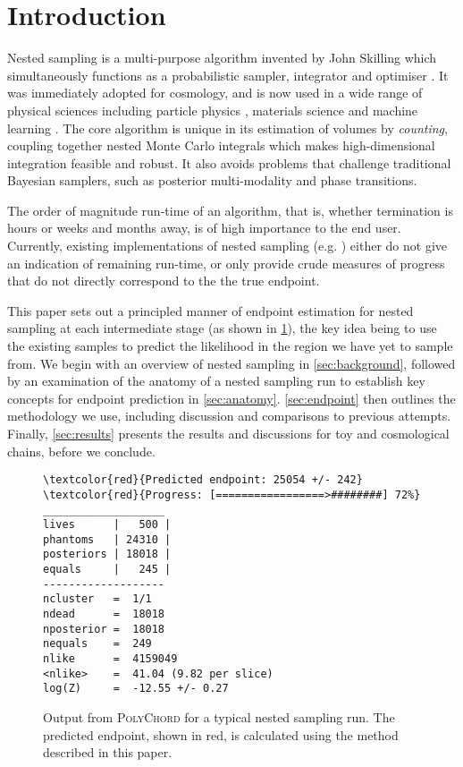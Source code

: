 \documentclass[usenatbib]{mnras}
\begin{document}
\section{Introduction}
Nested sampling is a multi-purpose algorithm invented by John Skilling which simultaneously functions as a probabilistic sampler, integrator and optimiser \citep{skilling}. It was immediately adopted for cosmology, and is now used in a wide range of physical sciences including particle physics \citep{Trotta_2008}, materials science \citep{materials} and machine learning \citep{sparse_reconstruction}. The core algorithm is unique in its estimation of volumes by \textit{counting}, coupling together nested Monte Carlo integrals which makes high-dimensional integration feasible and robust. It also avoids problems that challenge traditional Bayesian samplers, such as posterior multi-modality and phase transitions.
\par
The order of magnitude run-time of an algorithm, that is, whether termination is hours or weeks and months away, is of high importance to the end user. Currently, existing implementations of nested sampling (e.g. \citealt{multinest, polychord, dnest, dynesty, ultranest, nessai,proxnest}) either do not give an indication of remaining run-time, or only provide crude measures of progress that do not directly correspond to the the true endpoint.
\par
This paper sets out a principled manner of endpoint estimation for nested sampling at each intermediate stage (as shown in \cref{fig:polychord_output}), the key idea being to use the existing samples to predict the likelihood in the region we have yet to sample from. We begin with an overview of nested sampling in \cref{sec:background}, followed by an examination of the anatomy of a nested sampling run to establish key concepts for endpoint prediction in \cref{sec:anatomy}. \cref{sec:endpoint} then outlines the methodology we use, including discussion and comparisons to previous attempts. Finally, \cref{sec:results} presents the results and discussions for toy and cosmological chains, before we conclude.
\begin{figure}
\begin{Verbatim}[frame=single, commandchars=\\\{\}]
\textcolor{red}{Predicted endpoint: 25054 +/- 242}
\textcolor{red}{Progress: [=================>########] 72%}
___________________
lives      |   500 |
phantoms   | 24310 |
posteriors | 18018 |
equals     |   245 |
-------------------
ncluster   =  1/1
ndead      =  18018
nposterior =  18018
nequals    =  249
nlike      =  4159049
<nlike>    =  41.04 (9.82 per slice)
log(Z)     =  -12.55 +/- 0.27
\end{Verbatim}
\caption{Output from \textsc{PolyChord} for a typical nested sampling run. The predicted endpoint, shown in red, is calculated using the method described in this paper.}
\label{fig:polychord_output}
\end{figure}
\end{document}
